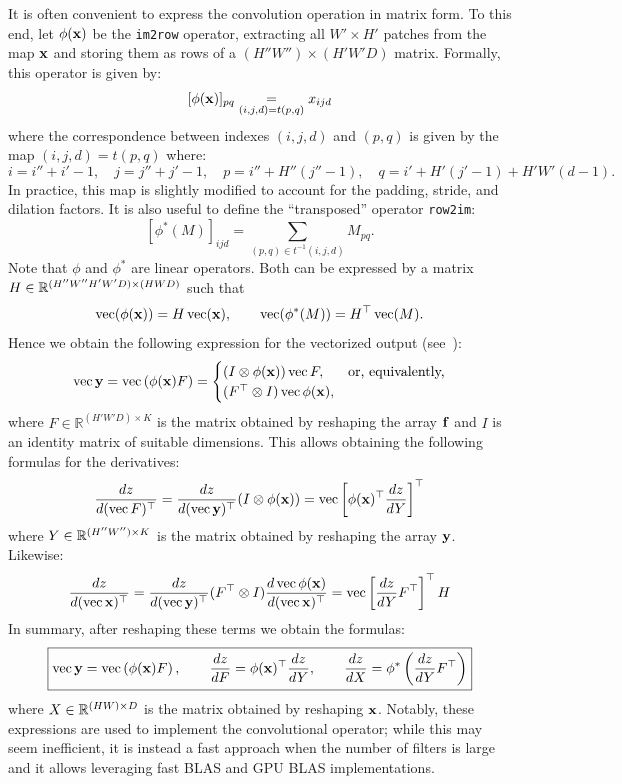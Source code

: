 It is often convenient to express the convolution operation in matrix form. To this end, let $\phi(\mathbf{x})$ be the \verb!im2row! operator, extracting all $W' \times H'$ patches from the map $\mathbf{x}$ and storing them as rows of a $(H''W'') \times (H'W'D)$ matrix. Formally, this operator is given by:
\[
[\phi(\mathbf{x})]_{pq} \underset{(i,j,d)=t(p,q)}{=} x_{ijd}
\]
where the correspondence between indexes $(i,j,d)$ and $(p,q)$ is given by the map $(i,j,d) = t(p,q)$ where:
\[
i = i''+i'-1, \quad
j = j''+j'-1, \quad
p = i'' + H'' (j''-1), \quad
q = i' + H'(j'-1) + H'W' (d-1).
\]
In practice, this map is slightly modified to account for the padding, stride, and dilation factors. It is also useful to define the ``transposed'' operator \verb!row2im!:
\[
[\phi^*(M)]_{ijd}
=
\sum_{(p,q) \in t^{-1}(i,j,d)}
M_{pq}.
\]
Note that $\phi$ and $\phi^*$ are linear operators. Both can be expressed by a matrix $H\in\mathbb{R}^{(H''W''H'W'D) \times(HWD)}$ such that
\[
\operatorname{vec}(\phi(\mathbf{x})) = H \operatorname{vec}(\mathbf{x}), \qquad 
\operatorname{vec}(\phi^*(M)) = H^\top \operatorname{vec}(M).
\]
Hence we obtain the following expression for the vectorized output (see~\cite{kinghorn96integrals}):
\[
\operatorname{vec}\mathbf{y} = 
\operatorname{vec}\left(\phi(\mathbf{x}) F\right)
=
\begin{cases}
(I \otimes \phi(\mathbf{x})) \operatorname{vec} F, & \text{or, equivalently,} \\
(F^\top \otimes I) \operatorname{vec} \phi(\mathbf{x}),
\end{cases}
\]
where $F\in\mathbb{R}^{(H'W'D)\times K}$ is the matrix obtained by reshaping the array $\mathbf{f}$ and $I$ is an identity matrix of suitable dimensions. This allows obtaining the following formulas for the derivatives:
\[
\frac{dz}{d(\operatorname{vec} F)^\top}
=
\frac{dz}{d(\operatorname{vec}\mathbf{y})^\top}
(I \otimes \phi(\mathbf{x}))
= \operatorname{vec}\left[ 
\phi(\mathbf{x})^\top 
\frac{dz}{dY}
\right]^\top
\]
where $Y\in\mathbb{R}^{(H''W'')\times K}$ is the matrix obtained by reshaping the array $\mathbf{y}$. Likewise:
\[
\frac{dz}{d(\operatorname{vec} \mathbf{x})^\top}
=
\frac{dz}{d(\operatorname{vec}\mathbf{y})^\top}
(F^\top \otimes I)
\frac{d\operatorname{vec} \phi(\mathbf{x})}{d(\operatorname{vec} \mathbf{x})^\top}
=
\operatorname{vec}\left[ 
\frac{dz}{dY}
F^\top
\right]^\top
H
\]
In summary, after reshaping these terms we obtain the formulas:
\[
\boxed{
	\operatorname{vec}\mathbf{y} = 
	\operatorname{vec}\left(\phi(\mathbf{x}) F\right),
	\qquad
	\frac{dz}{dF}
	=
	\phi(\mathbf{x})^\top\frac{d z}{d Y},
	\qquad
	\frac{d z}{d X}
	=
	\phi^*\left(
	\frac{d z}{d Y}F^\top
	\right)
}
\]
where $X\in\mathbb{R}^{(HW)\times D}$ is the matrix obtained by reshaping $\mathbf{x}$. Notably, these expressions are used to implement the convolutional operator; while this may seem inefficient, it is instead a fast approach when the number of filters is large and it allows leveraging fast BLAS and GPU BLAS implementations.

